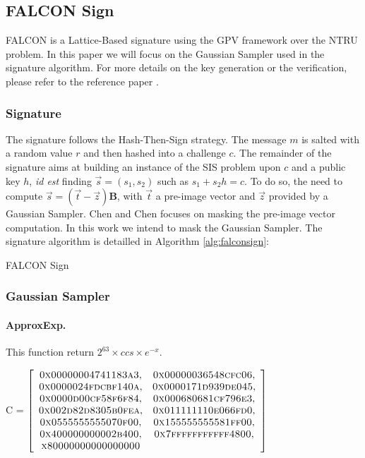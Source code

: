 \documentclass[runningheads]{llncs}
\begin{document}
\subsection{FALCON Sign}
FALCON \cite{prest2020falcon} is a Lattice-Based signature using the GPV framework over the NTRU problem. In this paper we will focus on the Gaussian Sampler used in the signature algorithm. For more details on the key generation or the verification, please refer to the reference paper \cite{prest2020falcon}.

\subsubsection{Signature} The signature follows the Hash-Then-Sign strategy. The message $m$ is salted with a random value $r$ and then hashed into a challenge $c$. The remainder of the signature aims at building an instance of the SIS problem upon $c$ and a public key $h$, \emph{id est} finding $\vec{s} =(s_1,s_2)$ such as $s_1 + s_2 h = c$. To do so, the need to compute $\vec{s} = (\vec{t}-\vec{z})\mathbf{B}$, with $\vec{t}$ a pre-image vector and $\vec{z}$ provided by a Gaussian Sampler. Chen and Chen \cite{Chen_Chen_2024} focuses on masking the pre-image vector computation. In this work we intend to mask the Gaussian Sampler. The signature algorithm is detailled in Algorithm \ref{alg:falconsign}:

\begin{algorithm}[H]
  \caption{FALCON Sign \cite{prest2020falcon}}
  \label{alg:falconsign}
\end{algorithm}

\subsubsection{Gaussian Sampler}

\paragraph{ApproxExp.} This function return $2^{63}\times ccs \times e^{-x}$.

C =
$ \left[\begin{array}{cc}
     \textsc{0x00000004741183a3}, & \textsc{0x00000036548cfc06},\\
        \textsc{0x0000024fdcbf140a},& \textsc{0x0000171d939de045},\\
     \textsc{0x0000d00cf58f6f84},& \textsc{0x000680681cf796e3},\\
     \textsc{0x002d82d8305b0fea},& \textsc{0x011111110e066fd0},\\
     \textsc{0x0555555555070f00},& \textsc{0x155555555581ff00},\\
    \textsc{0x400000000002b400},&\textsc{0x7fffffffffff4800}, \\
     \textsc{x80000000000000000}&
\end{array}\right]$
\end{document}
